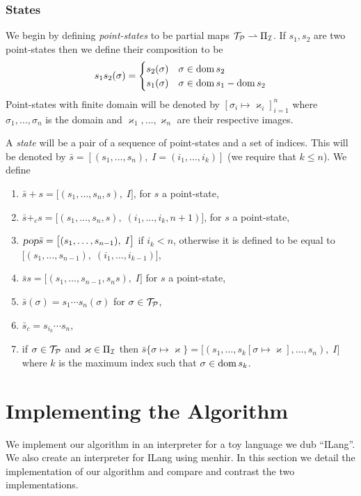 \documentclass{llncs}
\newcounter{algo}
\begin{document}
\subsubsection{States}

We begin by defining \textit{point-states} to be partial maps $\mathcal T_{\mathcal P}\rightharpoonup\Pi_{\mathcal I}$.
If $s_1,s_2$ are two point-states then we define their composition to be
\[ s_1s_2(\sigma) = \begin{cases} s_2(\sigma) & \sigma\in\operatorname{dom} s_2\\ s_1(\sigma) & \sigma\in\operatorname{dom} s_1-\operatorname{dom} s_2\end{cases} \]
Point-states with finite domain will be denoted by $[\sigma_i\mapsto\varkappa_i]_{i=1}^n$ where $\sigma_1,\dots,\sigma_n$ is the domain and $\varkappa_1,\dots,\varkappa_n$ are their respective images.

A \textit{state} will be a pair of a sequence of point-states and a set of indices.
This will be denoted by $\bar s=[(s_1,\dots,s_n),\;I=(i_1,\dots,i_k)]$ (we require that $k\leq n$).
We define
\begin{enumerate}
    \item $\bar s+s=\bigl[(s_1,\dots,s_n,s),\;I\bigr]$, for $s$ a point-state,
    \item $\bar s+_cs=\bigl[(s_1,\dots,s_n,s),\;(i_1,\dots,i_k,n+1)\bigr]$, for $s$ a point-state,
    \item $\textsl{pop}\bar s=\bigl[(s_1,\dots,s_{n-1}),\;I\bigr]$ if $i_k<n$, otherwise it is defined to be equal to $\bigl[(s_1,\dots,s_{n-1}),\;(i_1,\dots,i_{k-1})\bigr]$,
    \item $\bar ss=\bigl[(s_1,\dots,s_{n-1},s_ns),\;I\bigr]$ for $s$ a point-state,
    \item $\bar s(\sigma)=s_1\cdots s_n(\sigma)$ for $\sigma\in\mathcal T_{\mathcal P}$,
    \item $\bar s_c=s_{i_k}\cdots s_n$,
    \item if $\sigma\in\mathcal T_{\mathcal P}$ and $\varkappa\in\Pi_{\mathcal I}$ then $\bar s\{\sigma\mapsto\varkappa\}=\bigl[(s_1,\dots,s_k[\sigma\mapsto\varkappa],\dots,s_n),\;I\bigr]$ where $k$ is the maximum index such that
    $\sigma\in\operatorname{dom} s_k$.
\end{enumerate}

\section{Implementing the Algorithm}

We implement our algorithm in an interpreter for a toy language we dub ``ILang''.
We also create an interpreter for ILang using menhir\cite{menhir}.
In this section we detail the implementation of our algorithm and compare and contrast the two implementations.
\end{document}
